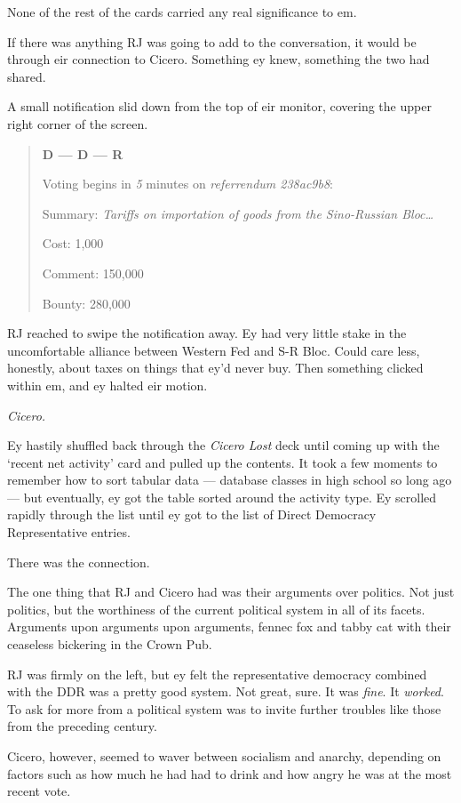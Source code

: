 None of the rest of the cards carried any real significance to em.

If there was anything RJ was going to add to the conversation, it would be through eir connection to Cicero. Something ey knew, something the two had shared.

A small notification slid down from the top of eir monitor, covering the upper right corner of the screen.

\begin{quote}
\textbf{D — D — R}

Voting begins in \emph{5} minutes on \emph{referrendum 238ac9b8}:

Summary: \emph{Tariffs on importation of goods from the Sino-Russian Bloc\ldots{}}

Cost: 1,000

Comment: 150,000

Bounty: 280,000
\end{quote}

RJ reached to swipe the notification away. Ey had very little stake in the uncomfortable alliance between Western Fed and S-R Bloc. Could care less, honestly, about taxes on things that ey'd never buy. Then something clicked within em, and ey halted eir motion.

\emph{Cicero.}

Ey hastily shuffled back through the \emph{Cicero Lost} deck until coming up with the `recent net activity' card and pulled up the contents. It took a few moments to remember how to sort tabular data — database classes in high school so long ago — but eventually, ey got the table sorted around the activity type. Ey scrolled rapidly through the list until ey got to the list of Direct Democracy Representative entries.

There was the connection.

The one thing that RJ and Cicero had was their arguments over politics. Not just politics, but the worthiness of the current political system in all of its facets. Arguments upon arguments upon arguments, fennec fox and tabby cat with their ceaseless bickering in the Crown Pub.

RJ was firmly on the left, but ey felt the representative democracy combined with the DDR was a pretty good system. Not great, sure. It was \emph{fine}. It \emph{worked}. To ask for more from a political system was to invite further troubles like those from the preceding century.

Cicero, however, seemed to waver between socialism and anarchy, depending on factors such as how much he had had to drink and how angry he was at the most recent vote.

